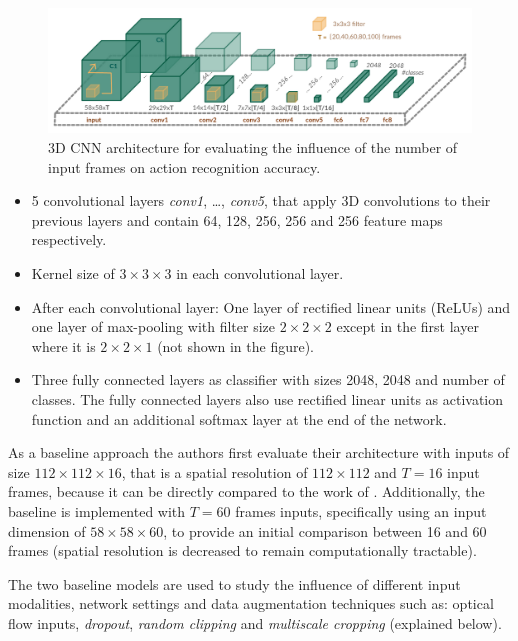 \begin{figure}[H]
    \centering
    \includegraphics[width=\textwidth]{img_deep/longterm_architecture}
    \caption{3D CNN architecture for evaluating the influence of the number of input frames on action recognition accuracy. \cite{varol_long-term_2016}}
    \label{fig:longterm_architecture}
\end{figure}

\begin{itemize}
    \item 5 convolutional layers \textit{conv1}, \ldots, \textit{conv5}, that apply 3D convolutions to their previous layers and contain 64, 128, 256, 256 and 256 feature maps respectively.
    \item Kernel size of $3\times3\times3$ in each convolutional layer.
    \item After each convolutional layer: One layer of rectified linear units (ReLUs) and one layer of max-pooling with filter size $2\times2\times2$ except in the first layer where it is $2\times2\times1$ (not shown in the figure).
    \item Three fully connected layers as classifier with sizes 2048, 2048 and number of classes.
    The fully connected layers also use rectified linear units as activation function and an additional softmax layer at the end of the network.
\end{itemize}

As a baseline approach the authors first evaluate their architecture with inputs of size $112\times112\times16$, that is a spatial resolution of $112\times112$ and $T=16$ input frames, because it can be directly compared to the work of \textcite{tran_learning_2015}.
Additionally, the baseline is implemented with $T=60$ frames inputs, specifically using an input dimension of $58\times58\times60$, to provide an initial comparison between 16 and 60 frames (spatial resolution is decreased to remain computationally tractable).

The two baseline models are used to study the influence of different input modalities, network settings and data augmentation techniques such as: optical flow inputs, \textit{dropout}\cite{srivastava_dropout:_2014}, \textit{random clipping} and \textit{multiscale cropping} (explained below).

